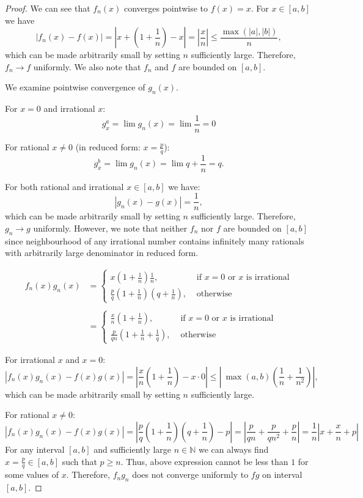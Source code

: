 \documentclass{article}
\begin{document}
\begin{proof}
We can see that $f_n(x)$ converges pointwise to $f(x) = x$. For $x \in [a,b]$ we have
$$ | f_n(x) - f(x) | = \left| x + \left( 1+\frac{1}{n} \right) - x \right| = \left| \frac{x}{n} \right| \leq \frac{\max(|a|,|b|)}{n}, $$
which can be made arbitrarily small by setting $n$ sufficiently large. Therefore, $f_n \to f$ uniformly. We also note that $f_n$ and $f$ are bounded on $[a,b]$.

We examine pointwise convergence of $g_n(x)$.

For $x=0$ and irrational $x$:
$$ g^a_x = \lim g_n(x) = \lim \frac{1}{n} = 0 $$

For rational $x \neq 0$ (in reduced form: $x = \frac{p}{q}$):
$$ g^b_x = \lim g_n(x) = \lim q+\frac{1}{n} = q. $$

For both rational and irrational $x \in [a,b]$ we have:
$$ |g_n(x) - g(x)| = \frac{1}{n}, $$
which can be made arbitrarily small by setting $n$ sufficiently large. Therefore, $g_n \to g$ uniformly. However, we note that neither $f_n$ nor $f$ are bounded on $[a,b]$ since neighbourhood of any irrational number contains infinitely many rationals with arbitrarily large denominator in reduced form.

\begin{equation*}
\begin{aligned}
f_n(x) g_n(x) 
& =
    \begin{cases}
        x \left( 1+\frac{1}{n} \right) \frac{1}{n}, & \text{ if $x=0$ or $x$ is irrational} \\
        \frac{p}{q} \left( 1+\frac{1}{n} \right) (q+\frac{1}{n}), & \text{ otherwise}
    \end{cases} \\\\
& =
    \begin{cases}
        \frac{x}{n} \left( 1+\frac{1}{n} \right), & \text{ if $x=0$ or $x$ is irrational} \\
        \frac{p}{qn} \left( 1+\frac{1}{n}+\frac{1}{q} \right), & \text{ otherwise}
    \end{cases}
\end{aligned}
\end{equation*}

For irrational $x$ and $x=0$:
$$ |f_n(x) g_n(x) - f(x) g(x) | = \left| \frac{x}{n} \left( 1+\frac{1}{n} \right) - x \cdot 0 \right| \leq \left| \> \max(a,b) \left( \frac{1}{n}+\frac{1}{n^2} \right) \right|, $$
which can be made arbitrarily small by setting $n$ sufficiently large.

For rational $x \neq 0$:
$$ |f_n(x) g_n(x) - f(x) g(x) | = \left| \frac{p}{q} \left( 1+\frac{1}{n} \right) \left( q+\frac{1}{n} \right) - p \right| = \left| \frac{p}{qn} + \frac{p}{qn^2} + \frac{p}{n} \right| = \frac{1}{n} \left| x + \frac{x}{n} + p \right| $$
For any interval $[a,b]$ and sufficiently large $n\in\mathbb{N}$ we can always find $x=\frac{p}{q} \in [a,b]$ such that $p \geq n$. Thus, above expression cannot be less than $1$ for some values of $x$. Therefore, $f_n g_n$ does not converge uniformly to $f g$ on interval $[a,b]$.

\end{proof}
\end{document}
